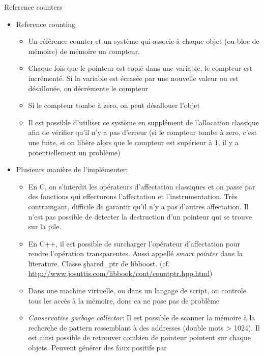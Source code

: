 \begin{frame}[fragile=singleslide]{Reference counters}
  \begin{itemize} 
  \item Reference counting
    \begin{itemize} 
    \item  Un référence  counter et  un système  qui associe  à chaque
      objet (ou bloc de mémoire) de mémoire un compteur.
    \item Chaque fois que le  pointeur est copié dans une variable, le
      compteur  est incrémenté.  Si la  variable est  écrasée  par une
      nouvelle valeur ou est désallouée, on décrémente le compteur
    \item Si le compteur tombe à zero, on peut désallouer l'objet
    \item  Il est  possible  d'utiliser ce  système  en supplément  de
      l'allocation classique afin de vérifier qu'il n'y a pas d'erreur
      (si  le compteur tombe  à zero,  c'est une  fuite, si  on libère
      alors que le compteur est  supérieur à 1, il y a potentiellement
      un problème)
    \end{itemize} 
  \item Plusieurs manière de l'implémenter:
    \begin{itemize}
    \item En C, on  s'interdit les opérateurs d'affectation classiques
      et on  passe par des fonctions qui  effecturons l'affectation et
      l'instrumentation.  Très  contraingant,  difficile  de  garantir
      qu'il n'y a  pas d'autres affectation. Il n'est  pas possible de
      detecter la destruction d'un pointeur qui se trouve sur la pile.
    \item  En   C++,  il   est  possible  de   surcharger  l'opérateur
      d'affectation  pour  rendre  l'opération  transparentes.   Aussi
      appellé  \emph{smart   pointer}  dans  la   literature.   Classe
      \c{shared_ptr}            de            libboost.           (cf.
      \url{http://www.josuttis.com/libbook/cont/countptr.hpp.html})
    \item Dans une machine virtuelle, ou dans un langage de script, on
      controle tous  les accès à  la mémoire, donc  ca ne pose  pas de
      problème
    \item  \emph{Conservative garbage collector}:  Il est  possible de
      scanner la mémoire  à la recherche de pattern  ressemblant à des
      addresses  (double  mots  >  1024).  Il est  ainsi  possible  de
      retrouver combien de pointeur pointent sur chaque objets. Peuvent générer des faux positifs par 

\end{itemize}
\end{itemize}
\end{frame}
